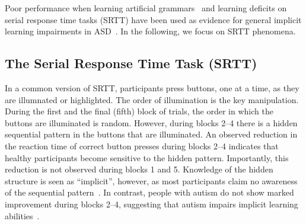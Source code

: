 Poor performance when learning artificial grammars~\cite{RefWorks:147} and learning deficits on serial response time tasks (SRTT) have been used as evidence for general implicit learning impairments in ASD~\cite{MostofskySH:2000:Procedural,KlingerLG:2006:Implicit}. In the following, we focus on SRTT phenomena.

\subsection{The Serial Response Time Task (SRTT)}


In a common version of SRTT, participants press buttons, one at a time, as they are illumnated or highlighted. The order of illumination is the key manipulation. During the first and the final (fifth) block of trials, the order in which the buttons are illuminated is random. However, during blocks 2--4 there is a hidden sequential pattern in the buttons that are illuminated. An observed reduction in the reaction time of correct button presses during blocks 2--4 indicates that healthy participants become sensitive to the hidden pattern. Importantly, this reduction is not observed during blocks 1 and 5. Knowledge of the hidden structure is seen as ``implicit'', however, as most participants claim no awareness of the sequential pattern~\cite{Cleeremans:1991:SSRT}. In contrast, people with autism do not show marked improvement during blocks 2--4, suggesting that autism impairs implicit learning abilities~\cite{MostofskySH:2000:Procedural}.

